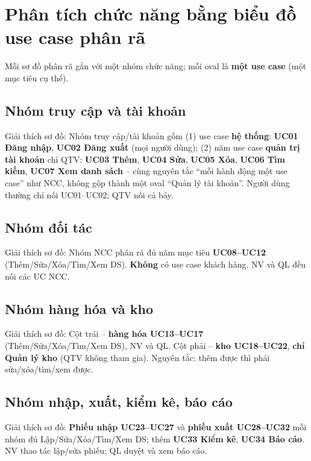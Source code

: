 \section{Phân tích chức năng bằng biểu đồ use case phân rã}

Mỗi sơ đồ phân rã gắn với một nhóm chức năng; mỗi oval là \textbf{một use case} (một mục tiêu cụ thể).

\subsection{Nhóm truy cập và tài khoản}


Giải thích sơ đồ: Nhóm truy cập/tài khoản gồm (1) use case \textbf{hệ thống}: \textbf{UC01 Đăng nhập}, \textbf{UC02 Đăng xuất} (mọi người dùng); (2) năm use case \textbf{quản trị tài khoản} chỉ QTV: \textbf{UC03 Thêm}, \textbf{UC04 Sửa}, \textbf{UC05 Xóa}, \textbf{UC06 Tìm kiếm}, \textbf{UC07 Xem danh sách} -- cùng nguyên tắc ``mỗi hành động một use case'' như NCC, không gộp thành một oval ``Quản lý tài khoản''. Người dùng thường chỉ nối UC01--UC02; QTV nối cả bảy.

\subsection{Nhóm đối tác}


Giải thích sơ đồ: Nhóm NCC phân rã đủ năm mục tiêu \textbf{UC08--UC12} (Thêm/Sửa/Xóa/Tìm/Xem DS). \textbf{Không} có use case khách hàng. NV và QL đều nối các UC NCC.

\subsection{Nhóm hàng hóa và kho}


Giải thích sơ đồ: Cột trái -- \textbf{hàng hóa UC13--UC17} (Thêm/Sửa/Xóa/Tìm/Xem DS), NV và QL. Cột phải -- \textbf{kho UC18--UC22}, \textbf{chỉ Quản lý kho} (QTV không tham gia). Nguyên tắc: thêm được thì phải sửa/xóa/tìm/xem được.

\subsection{Nhóm nhập, xuất, kiểm kê, báo cáo}


Giải thích sơ đồ: \textbf{Phiếu nhập UC23--UC27} và \textbf{phiếu xuất UC28--UC32} mỗi nhóm đủ Lập/Sửa/Xóa/Tìm/Xem DS; thêm \textbf{UC33 Kiểm kê}, \textbf{UC34 Báo cáo}. NV thao tác lập/sửa phiếu; QL duyệt và xem báo cáo.

